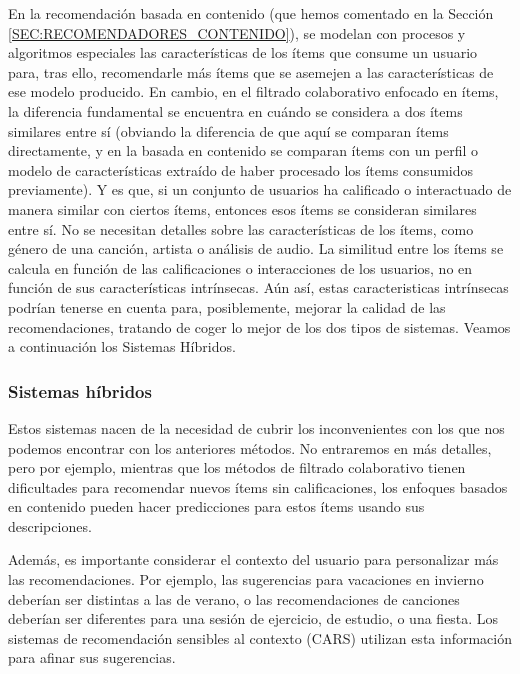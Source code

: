 En la recomendación basada en contenido (que hemos comentado en la Sección \ref{SEC:RECOMENDADORES_CONTENIDO}), se modelan con procesos y algoritmos especiales las características de los ítems
 que consume un usuario para, tras ello, recomendarle más ítems que se asemejen a las características de ese modelo producido. En cambio, en el filtrado
  colaborativo enfocado en ítems, la diferencia fundamental se encuentra en cuándo se considera a dos ítems similares entre sí (obviando la diferencia de 
  que aquí se comparan ítems directamente, y en la basada en contenido se comparan ítems con un perfil o modelo de características extraído de haber 
  procesado los ítems consumidos previamente). Y es que, si un conjunto de usuarios ha calificado o interactuado de manera similar con ciertos ítems, 
  entonces esos ítems se consideran similares entre sí. No se necesitan detalles sobre las características de los ítems, como género de una canción, 
  artista o análisis de audio. La similitud entre los ítems se calcula en función de las calificaciones o interacciones de los usuarios, no en función 
  de sus características intrínsecas. Aún así, estas caracteristicas intrínsecas podrían tenerse en cuenta para, posiblemente, mejorar la calidad de las
  recomendaciones, tratando de coger lo mejor de los dos tipos de sistemas. Veamos a continuación los Sistemas Híbridos.


\subsubsection{Sistemas híbridos\label{SEC:RECOMENDADORES_HIBRIDOS}}

Estos sistemas nacen de la necesidad de cubrir los inconvenientes con los que nos podemos encontrar con los anteriores métodos. No entraremos en más detalles,
pero por ejemplo, mientras que los métodos de filtrado colaborativo tienen dificultades para recomendar nuevos ítems sin calificaciones, los enfoques 
basados en contenido pueden hacer predicciones para estos ítems usando sus descripciones.

Además, es importante considerar el contexto del usuario para personalizar más las recomendaciones. Por ejemplo, las sugerencias para vacaciones en 
invierno deberían ser distintas a las de verano, o las recomendaciones de canciones deberían ser diferentes para una sesión de ejercicio, de estudio, o 
una fiesta. Los sistemas de recomendación sensibles al contexto (CARS) \cite{contextrecommender} utilizan esta información para afinar sus sugerencias.




